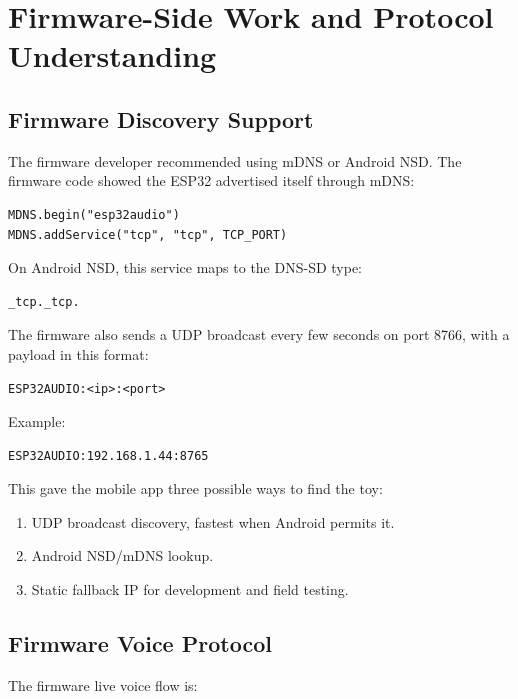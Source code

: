 \documentclass[11pt,a4paper]{article}
\begin{document}
\section{Firmware-Side Work and Protocol Understanding}

\subsection{Firmware Discovery Support}

The firmware developer recommended using mDNS or Android NSD. The firmware code showed the ESP32 advertised itself through mDNS:

\begin{lstlisting}[style=logstyle]
MDNS.begin("esp32audio")
MDNS.addService("tcp", "tcp", TCP_PORT)
\end{lstlisting}

On Android NSD, this service maps to the DNS-SD type:

\begin{lstlisting}[style=logstyle]
_tcp._tcp.
\end{lstlisting}

The firmware also sends a UDP broadcast every few seconds on port 8766, with a payload in this format:

\begin{lstlisting}[style=logstyle]
ESP32AUDIO:<ip>:<port>
\end{lstlisting}

Example:

\begin{lstlisting}[style=logstyle]
ESP32AUDIO:192.168.1.44:8765
\end{lstlisting}

This gave the mobile app three possible ways to find the toy:

\begin{enumerate}[leftmargin=*]
  \item UDP broadcast discovery, fastest when Android permits it.
  \item Android NSD/mDNS lookup.
  \item Static fallback IP for development and field testing.
\end{enumerate}

\subsection{Firmware Voice Protocol}

The firmware live voice flow is:
\end{document}
